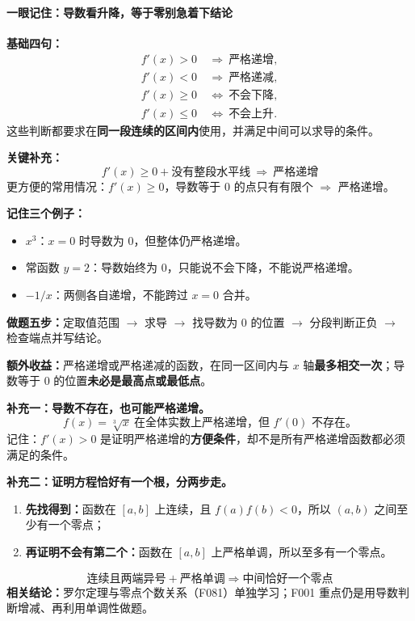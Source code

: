 \clearpage
\begin{summarybox}
\paragraph{一眼记住：导数看升降，等于零别急着下结论}
\textbf{基础四句：}
\[
\begin{aligned}
f'(x)>0&\ \Longrightarrow\ \text{严格递增},\\
f'(x)<0&\ \Longrightarrow\ \text{严格递减},\\
f'(x)\ge0&\ \Longleftrightarrow\ \text{不会下降},\\
f'(x)\le0&\ \Longleftrightarrow\ \text{不会上升}.
\end{aligned}
\]
这些判断都要求在\textbf{同一段连续的区间内}使用，并满足中间可以求导的条件。

\textbf{关键补充：}
\[
\boxed{\ f'(x)\ge0+\text{没有整段水平线}
\ \Longrightarrow\ \text{严格递增}\ }
\]
更方便的常用情况：$f'(x)\ge0$，导数等于 $0$ 的点只有有限个 $\Longrightarrow$ 严格递增。

\textbf{记住三个例子：}
\begin{itemize}
  \item $x^3$：$x=0$ 时导数为 $0$，但整体仍严格递增。
  \item 常函数 $y=2$：导数始终为 $0$，只能说不会下降，不能说严格递增。
  \item $-1/x$：两侧各自递增，不能跨过 $x=0$ 合并。
\end{itemize}

\textbf{做题五步：}定取值范围 $\to$ 求导 $\to$ 找导数为 $0$ 的位置 $\to$ 分段判断正负 $\to$ 检查端点并写结论。

\textbf{额外收益：}严格递增或严格递减的函数，在同一区间内与 $x$ 轴\textbf{最多相交一次}；导数等于 $0$ 的位置\textbf{未必是最高点或最低点}。


\textbf{补充一：导数不存在，也可能严格递增。}
\[
f(x)=\sqrt[3]{x}\ \text{在全体实数上严格递增，但 }f'(0)\text{ 不存在。}
\]
记住：$f'(x)>0$ 是证明严格递增的\textbf{方便条件}，却不是所有严格递增函数都必须满足的条件。

\textbf{补充二：证明方程恰好有一个根，分两步走。}
\begin{enumerate}
  \item \textbf{先找得到：}函数在 $[a,b]$ 上连续，且 $f(a)f(b)<0$，所以 $(a,b)$ 之间至少有一个零点；
  \item \textbf{再证明不会有第二个：}函数在 $[a,b]$ 上严格单调，所以至多有一个零点。
\end{enumerate}
\[
\boxed{\text{连续且两端异号}+\text{严格单调}
\Longrightarrow\text{中间恰好一个零点}}
\]
\textbf{相关结论：}罗尔定理与零点个数关系（F081）单独学习；F001 重点仍是用导数判断增减、再利用单调性做题。
\end{summarybox}

